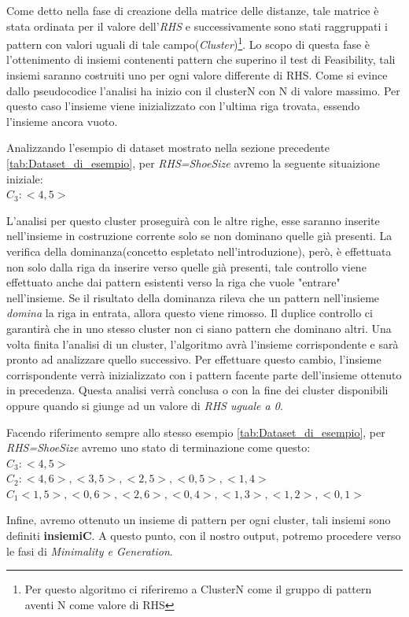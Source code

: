 Come detto nella fase di creazione della matrice delle distanze, tale matrice è stata ordinata per il valore dell'\emph{RHS} e successivamente sono stati raggruppati i pattern con valori uguali di tale campo(\emph{Cluster})\footnote{Per questo algoritmo ci riferiremo a ClusterN come il gruppo di pattern aventi N come valore di RHS }.
Lo scopo di questa fase è l'ottenimento di insiemi contenenti pattern che superino il test di Feasibility, tali insiemi saranno costruiti uno per ogni valore differente di RHS.
Come si evince dallo pseudocodice l'analisi ha inizio con il clusterN con N di valore massimo.
Per questo caso l'insieme viene inizializzato con l'ultima riga trovata, essendo l'insieme ancora vuoto.
\begin{center}
	Analizzando l'esempio di dataset mostrato nella sezione precedente \ref{tab:Dataset_di_esempio}, per \emph{RHS=ShoeSize} avremo la seguente situaizione iniziale:\\
	$C_3: {<4,5>}$\\
\end{center}
L'analisi per questo cluster proseguirà con le altre righe, esse saranno inserite nell'insieme in costruzione corrente solo se non dominano quelle già presenti. La verifica della dominanza(concetto espletato nell'introduzione), però, è effettuata non solo dalla riga da inserire verso quelle già presenti, tale controllo viene effettuato anche dai pattern esistenti verso la riga che vuole "entrare" nell'insieme. Se il risultato della dominanza rileva che un pattern nell'insieme \emph{domina} la riga in entrata, allora questo viene rimosso.
Il duplice controllo ci garantirà che in uno stesso cluster non ci siano pattern che dominano altri.
Una volta finita l'analisi di un cluster, l'algoritmo avrà l'insieme corrispondente e sarà pronto ad analizzare quello successivo. Per effettuare questo cambio, l'insieme corrispondente verrà inizializzato con i pattern facente parte dell'insieme ottenuto in precedenza.
Questa analisi verrà conclusa o con la fine dei cluster disponibili oppure quando si giunge ad un valore di \emph{RHS uguale a 0}.
\begin{center}
	Facendo riferimento sempre allo stesso esempio \ref{tab:Dataset_di_esempio}, per \emph{RHS=ShoeSize} avremo uno stato di terminazione come questo:\\
	$C_3: {<4,5>}$\\
	$C_2: {<4,6>, <3,5>, <2,5>, <0,5>, <1,4>}$\\
	$C_1 {<1,5>, <0,6>, <2,6>, <0,4>, <1,3>, <1,2>, <0,1>}$\\
\end{center}
Infine, avremo ottenuto un insieme di pattern per ogni cluster, tali insiemi sono definiti \textbf{insiemiC}.
A questo punto, con il nostro output, potremo procedere verso le fasi di \emph{Minimality e Generation}.